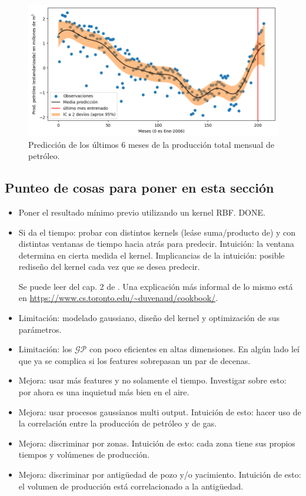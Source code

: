 \documentclass[a4paper]{article}
\newcommand{\gp}{\ensuremath{\mathcal{GP}}}
\begin{document}
\begin{figure}[H]
	\centering
	\includegraphics[trim={0cm 0cm 0cm 0cm},clip,width=\textwidth]{pred3.png}
	\caption{Predicción de los últimos 6 meses de la producción total mensual de petróleo.}
	\label{fig:pred3}
\end{figure}




\subsection*{Punteo de cosas para poner en esta sección}
\begin{itemize}
	\item Poner el resultado mínimo previo utilizando un kernel RBF. DONE.
	
	\item Si da el tiempo: probar con distintos kernels (leáse suma/producto de) y con distintas ventanas de tiempo hacia atrás para predecir. Intuición: la ventana determina en cierta medida el kernel. Implicancias de la intuición: posible rediseño del kernel cada vez que se desea predecir.
	
	Se puede leer del cap. 2 de \cite{tesisduvenaud}. Una explicación más informal de lo mismo está en \url{https://www.cs.toronto.edu/~duvenaud/cookbook/}.
	
	\item Limitación: modelado gaussiano, diseño del kernel y optimización de sus parámetros.
	\item Limitación: los $\gp$ con poco eficientes en altas dimensiones. En algún lado leí que ya se complica si los features sobrepasan un par de decenas.
	\item Mejora: usar más features y no solamente el tiempo. Investigar sobre esto: por ahora es una inquietud más bien en el aire.
	\item Mejora: usar procesos gaussianos multi output. Intuición de esto: hacer uso de la correlación entre la producción de petróleo y de gas.
	\item Mejora: discriminar por zonas. Intuición de esto: cada zona tiene sus propios tiempos y volúmenes de producción.
	\item Mejora: discriminar por antigüedad de pozo y/o yacimiento. Intuición de esto: el volumen de producción está correlacionado a la antigüedad.
\end{itemize}
\end{document}
